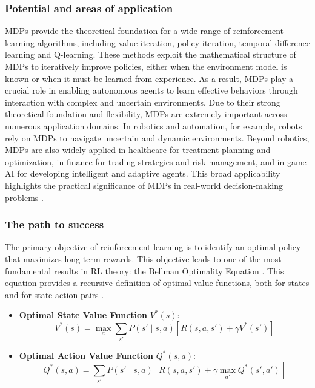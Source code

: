 \documentclass[12pt,a4paper]{report}
\begin{document}
\subsubsection{Potential and areas of application }
MDPs provide the theoretical foundation for a wide range of reinforcement learning algorithms, including value iteration, policy iteration, temporal-difference learning and Q-learning. These methods exploit the mathematical structure of MDPs to iteratively improve policies, either when the environment model is known or when it must be learned from experience. As a result, MDPs play a crucial role in enabling autonomous agents to learn effective behaviors through interaction with complex and uncertain environments.
Due to their strong theoretical foundation and flexibility, MDPs are extremely important across numerous application domains. In robotics and automation, for example, robots rely on MDPs to navigate uncertain and dynamic environments. Beyond robotics, MDPs are also widely applied in healthcare for treatment planning and optimization, in finance for trading strategies and risk management, and in game AI for developing intelligent and adaptive agents. This broad applicability highlights the practical significance of MDPs in real-world decision-making problems \cite{chiave45}.


\subsubsection{The path to success}
The primary objective of reinforcement learning is to identify an optimal policy 
that maximizes long-term rewards. This objective leads to one of the most fundamental 
results in RL theory: the Bellman Optimality Equation \cite{chiave7}. 
This equation provides a recursive definition of optimal value functions, both for 
states and for state-action pairs \cite{chiave44}.

\begin{itemize}
    \item \textbf{Optimal State Value Function} $V^*(s)$:
    \begin{equation}
        V^*(s) = \max_{a} \sum_{s'} P(s' \mid s, a) 
        \left[ R(s, a, s') + \gamma V^*(s') \right]
    \end{equation}

    \item \textbf{Optimal Action Value Function} $Q^*(s, a)$:
    \begin{equation}
        Q^*(s, a) = \sum_{s'} P(s' \mid s, a) 
        \left[ R(s, a, s') + \gamma \max_{a'} Q^*(s', a') \right]
    \end{equation}
\end{itemize}
\end{document}
